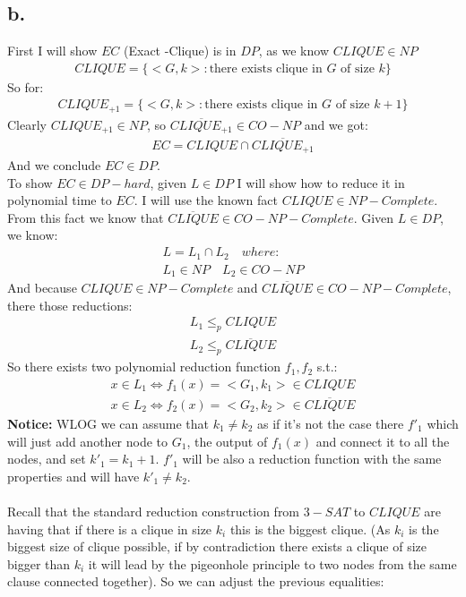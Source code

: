 \documentclass[11pt]{article}
\theoremstyle{plain}
\theoremstyle{nonumberplainnobrackets}
\begin{document}
\subsection*{b. }
First I will show $EC$ (Exact -Clique) is in $DP$, as we know $CLIQUE\in NP$
\begin{align*}
CLIQUE = \{ <G,k> : \text{there exists clique in } G \text{ of size } k \}
\end{align*}
So for: 
\begin{align*}
CLIQUE_{+1} = \{ <G,k> : \text{there exists clique in } G \text{ of size } k+1 \}
\end{align*}
Clearly $CLIQUE_{+1} \in NP$, so $\overline{CLIQUE_{+1}} \in CO-NP$ and we got:
\begin{align*}
EC = CLIQUE \cap \overline{CLIQUE_{+1}}
\end{align*}
And we conclude $EC\in DP$.\\
To show $EC \in DP-hard$, given $L\in DP$ I will show how to reduce it in polynomial time to $EC$. I will use the known fact $CLIQUE\in NP-Complete$.
From this fact we know that $\overline{CLIQUE}\in CO-NP-Complete$.
Given $L\in DP$, we know:
\begin{align*}
L = L_1\cap L_2\quad  where:\\
L_1\in NP\quad L_2\in CO-NP
\end{align*}
And because $CLIQUE\in NP-Complete$ and $\overline{CLIQUE}\in CO-NP-Complete$, there those reductions:
\begin{align*}
L_1 \le_p CLIQUE \\
L_2 \le_p \overline{CLIQUE}
\end{align*}
So there exists two polynomial reduction function $f_1,f_2$ s.t.:
\begin{align*}
x\in L_1 \iff f_1(x)=<G_1,k_1> \in CLIQUE \\
x \in L_2 \iff f_2(x)=<G_2,k_2> \in \overline{CLIQUE}
\end{align*}
\textbf{Notice: } WLOG we can assume that $k_1 \ne k_2$ as if it's not the case there $f'_1$ which will just add another node to $G_1$, the output of $f_1(x)$ and connect it to all the nodes, and set $k'_1 = k_1 +1$. $f'_1$ will be also a reduction function with the same properties and will have $k'_1 \ne k_2$.\\ \\
Recall that the standard reduction construction from $3-SAT$ to $CLIQUE$ are having that if there is a clique in size $k_i$ this is the biggest clique. (As $k_i$ is the biggest size of clique possible, if by contradiction there exists a clique of size bigger than $k_i$ it will lead by the pigeonhole principle to two nodes from the same clause connected together). So we can adjust the previous equalities:
\end{document}
